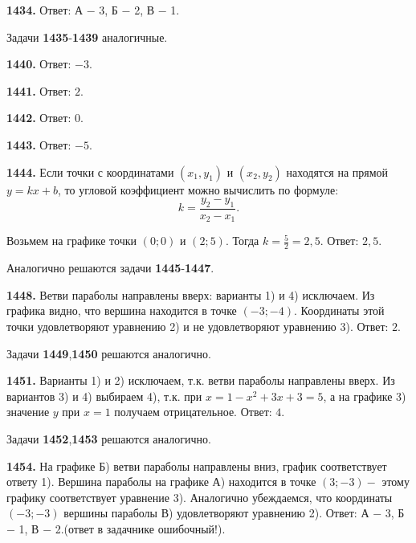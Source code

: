 \textbf{1434.}\newline \null \hspace*{\fill} Ответ: А $-$ 3, Б $-$ 2, В $-$ 1.

Задачи \textbf{1435}-\textbf{1439}  аналогичные.

\textbf{1440.} \newline \null \hspace*{\fill} Ответ: $-3$.   

\textbf{1441.} \newline \null \hspace*{\fill} Ответ: $2$.  

\textbf{1442.} \newline \null \hspace*{\fill} Ответ: $0$.     

\textbf{1443.} \newline \null \hspace*{\fill} Ответ: $-5$.   

\textbf{1444.} Если точки с координатами $(x_1,y_1)$ и $(x_2,y_2)$ находятся на прямой $y=kx+b$, то угловой коэффициент можно вычислить по формуле:$$k=\frac{y_2-y_1}{x_2-x_1}.$$

Возьмем на графике точки $(0;0)$ и $(2;5)$. Тогда $k=\frac{5}{2}=2,5$. \newline \null \hspace*{\fill} Ответ: $2,5$. 

Аналогично решаются задачи \textbf{1445}-\textbf{1447}.

\textbf{1448.} Ветви параболы направлены вверх: варианты  1) и 4) исключаем. Из графика видно, что вершина находится в точке $(-3;-4)$. Координаты этой точки удовлетворяют уравнению 2) и не удовлетворяют уравнению 3). \newline \null \hspace*{\fill} Ответ: $2$. 

Задачи \textbf{1449},\textbf{1450} решаются аналогично.

\textbf{1451.}  Варианты 1) и 2) исключаем, т.к. ветви параболы направлены вверх. Из вариантов 3) и 4) выбираем 4), т.к. при $x=1-x^2+3x+3=5$, а на графике 3) значение $y$ при $x=1$ получаем отрицательное. \newline \null \hspace*{\fill} Ответ: $4$. 

Задачи \textbf{1452},\textbf{1453} решаются аналогично.

\textbf{1454.} На графике Б) ветви параболы направлены вниз, график соответствует ответу 1). Вершина параболы на графике А) находится в точке $(3;-3)-$ этому графику соответствует уравнение 3). Аналогично убеждаемся, что координаты $(-3;-3)$ вершины параболы В) удовлетворяют уравнению  2). \newline \null \hspace*{\fill} Ответ: А $-$ 3, Б $-$ 1, В $-$ 2.(ответ в задачнике ошибочный!). 

